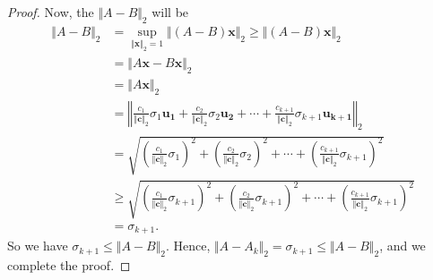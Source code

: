 \documentclass[12pt]{article}
\begin{document}
\begin{proof}
        Now, the $\Vert A-B \Vert_2$ will be
        \begin{align*}
            \Vert A-B \Vert_2
            &=\sup_{\Vert \mathbf{x}\Vert_2=1}{\Vert(A-B)\mathbf{x}\Vert_2}\geq \Vert(A-B)\mathbf{x}\Vert_2\\
            &=\Vert A\mathbf{x}-B\mathbf{x}\Vert_2\\
            &=\Vert A\mathbf{x}\Vert_2\\
            &=\left\Vert \frac{c_1}{\Vert\mathbf{c}\Vert_2}\sigma_1\mathbf{u_1}+\frac{c_2}{\Vert\mathbf{c}\Vert_2}\sigma_2\mathbf{u_2}+\cdots+\frac{c_{k+1}}{\Vert\mathbf{c}\Vert_2}\sigma_{k+1}\mathbf{u_{k+1}}\right\Vert_2\\
            &=\sqrt{\left(\frac{c_1}{\Vert\mathbf{c}\Vert_2}\sigma_1\right)^2+\left(\frac{c_2}{\Vert\mathbf{c}\Vert_2}\sigma_2\right)^2+\cdots+\left(\frac{c_{k+1}}{\Vert\mathbf{c}\Vert_2}\sigma_{k+1}\right)^2}\\
            &\geq \sqrt{\left(\frac{c_1}{\Vert\mathbf{c}\Vert_2}\sigma_{k+1}\right)^2+\left(\frac{c_2}{\Vert\mathbf{c}\Vert_2}\sigma_{k+1}\right)^2+\cdots+\left(\frac{c_{k+1}}{\Vert\mathbf{c}\Vert_2}\sigma_{k+1}\right)^2}\\
            &=\sigma_{k+1}.
        \end{align*}
        So we have $\sigma_{k+1}\leq \Vert A-B \Vert_2$. 
        Hence, $\Vert A-A_k \Vert_2=\sigma_{k+1}\leq \Vert A-B \Vert_2$, and we complete the proof.
    \end{proof}
\end{document}
